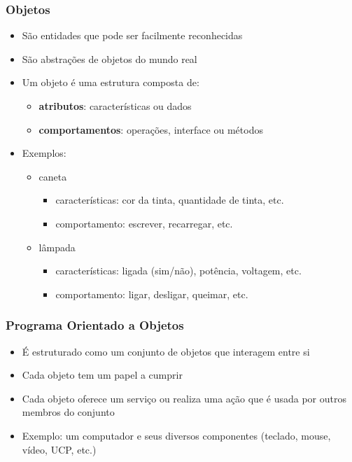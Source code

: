 \documentclass[aspectratio=169]{beamer}
\begin{document}
\begin{frame}\frametitle{Objetos}
\begin{itemize}
	\item São entidades que pode ser facilmente reconhecidas
	\item São abstrações de objetos do mundo real
	\item Um objeto é uma estrutura composta de:
	\begin{itemize}
		\item \textbf{atributos}: características ou dados
		\item \textbf{comportamentos}: operações, interface ou métodos
	\end{itemize}
	\item Exemplos:
	\begin{itemize}
		\item caneta
		\begin{itemize}
			\item características: cor da tinta, quantidade de tinta, etc.
			\item comportamento: escrever, recarregar, etc.
		\end{itemize}
		\item lâmpada
		\begin{itemize}
			\item características: ligada (sim/não), potência, voltagem, etc.
			\item comportamento: ligar, desligar, queimar, etc.
		\end{itemize}
	\end{itemize}
\end{itemize}
\end{frame}

\begin{frame}\frametitle{Programa Orientado a Objetos}
\begin{itemize}
	\item É estruturado como um conjunto de objetos que interagem entre si
	\item Cada objeto tem um papel a cumprir
	\item Cada objeto oferece um serviço ou realiza uma ação que é usada por outros membros do conjunto
	\item Exemplo: um computador e seus diversos componentes (teclado, mouse, vídeo, UCP, etc.)
\end{itemize}
\end{frame}
\end{document}
